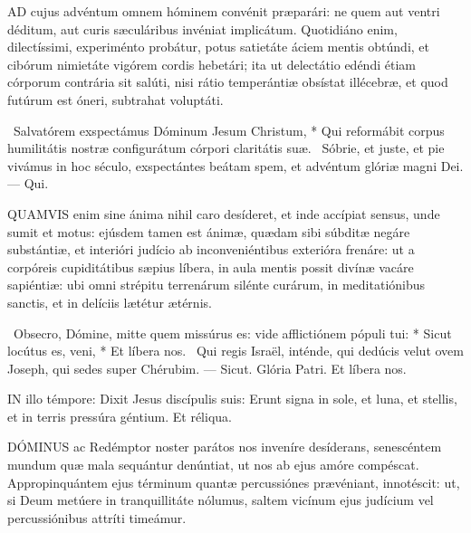 
\lettrine[lines=2]{A}{D} cujus advéntum omnem hóminem convénit præparári: ne quem aut ventri déditum, aut curis sæculáribus invéniat implicátum. Quotidiáno enim, dilectíssimi, experiménto probátur, potus satietáte áciem mentis obtúndi, et cibórum nimietáte vigórem cordis hebetári; ita ut delectátio edéndi étiam córporum contrária sit salúti, nisi rátio temperántiæ obsístat illécebræ, et quod futúrum est óneri, subtrahat voluptáti.

\R\ Salvatórem exspectámus Dóminum Jesum Christum, * Qui reformábit corpus humilitátis nostræ configurátum córpori claritátis suæ. \V\ Sóbrie, et juste, et pie vivámus in hoc século, exspectántes beátam spem, et advéntum glóriæ magni Dei. --- Qui.


\lettrine[lines=2]{Q}{UAMVIS} enim sine ánima nihil caro desíderet, et inde accípiat sensus, unde sumit et motus: ejúsdem tamen est ánimæ, quædam sibi súbditæ negáre substántiæ, et interióri judício ab inconveniéntibus exterióra frenáre: ut a corpóreis cupiditátibus sæpius líbera, in aula mentis possit divínæ vacáre sapiéntiæ: ubi omni strépitu terrenárum silénte curárum, in meditatiónibus sanctis, et in delíciis lætétur ætérnis.

\R\ Obsecro, Dómine, mitte quem missúrus es: vide afflictiónem pópuli tui: * Sicut locútus es, veni, * Et líbera nos. \V\ Qui regis Israël, inténde, qui dedúcis velut ovem Joseph, qui sedes super Chérubim. --- Sicut. Glória Patri. Et líbera nos.




\lettrine[lines=2]{I}{N} illo témpore: Dixit Jesus discípulis suis: Erunt signa in sole, et luna, et stellis, et in terris pressúra géntium. Et réliqua.



\lettrine[lines=2]{D}{ÓMINUS} ac Redémptor noster parátos nos inveníre desíderans, senescéntem mundum quæ mala sequántur denúntiat, ut nos ab ejus amóre compéscat. Appropinquántem ejus términum quantæ percussiónes prævéniant, innotéscit: ut, si Deum metúere in tranquillitáte nólumus, saltem vicínum ejus judícium vel percussiónibus attríti timeámur.

